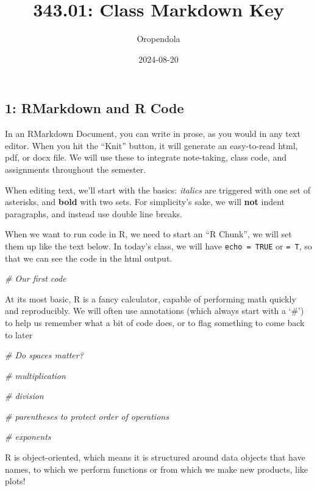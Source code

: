 \documentclass[
]{article}
\title{343.01: Class Markdown Key}
\author{Oropendola}
\date{2024-08-20}
\newenvironment{Shaded}{\begin{snugshade}}{\end{snugshade}}
\newcommand{\CommentTok}[1]{\textcolor[rgb]{0.56,0.35,0.01}{\textit{#1}}}
\begin{document}
\maketitle

\subsection{1: RMarkdown and R Code}\label{rmarkdown-and-r-code}

In an RMarkdown Document, you can write in prose, as you would in any
text editor. When you hit the ``Knit'' button, it will generate an
easy-to-read html, pdf, or docx file. We will use these to integrate
note-taking, class code, and assignments throughout the semester.

When editing text, we'll start with the basics: \emph{italics} are
triggered with one set of asterisks, and \textbf{bold} with two sets.
For simplicity's sake, we will \textbf{not} indent paragraphs, and
instead use double line breaks.

When we want to run code in R, we need to start an ``R Chunk'', we will
set them up like the text below. In today's class, we will have
\texttt{echo\ =\ TRUE} or \texttt{=\ T}, so that we can see the code in
the html output.

\begin{Shaded}
\begin{Highlighting}[]
\CommentTok{\# Our first code}
\end{Highlighting}
\end{Shaded}

At its most basic, R is a fancy calculator, capable of performing math
quickly and reproducibly. We will often use annotations (which always
start with a `\#') to help us remember what a bit of code does, or to
flag something to come back to later

\begin{Shaded}
\begin{Highlighting}[]
\CommentTok{\# Do spaces matter?}

\CommentTok{\# multiplication}

\CommentTok{\# division}

\CommentTok{\# parentheses to protect order of operations}

\CommentTok{\# exponents}
\end{Highlighting}
\end{Shaded}

R is object-oriented, which means it is structured around data objects
that have names, to which we perform functions or from which we make new
products, like plots!
\end{document}

